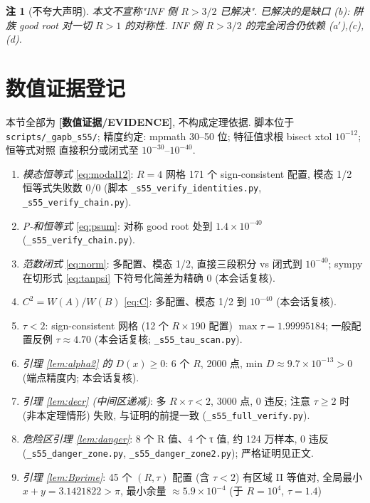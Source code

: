 \documentclass[UTF8]{ctexart}
\newtheorem{remark}[theorem]{注}
\newcommand{\EVID}{\textbf{[数值证据/EVIDENCE]}}
\begin{document}
\begin{remark}[不夸大声明]
	本文\emph{不}宣称"INF 侧 $R>3/2$ 已解决". 已解决的是缺口 (b):
	阱族 good root 对一切 $R>1$ 的对称性. INF 侧 $R>3/2$ 的完全闭合仍依赖
	(a$'$),(c),(d).
\end{remark}

\section{数值证据登记}\label{sec:numerics}

本节全部为 \EVID, 不构成定理依据. 脚本位于 \texttt{scripts/\_gapb\_s55/};
精度约定: mpmath 30--50 位; 特征值求根 bisect xtol $10^{-12}$; 恒等式对照
直接积分或闭式至 $10^{-30}$--$10^{-40}$.

\begin{enumerate}
	\item \emph{模态恒等式} \eqref{eq:modal12}: $R=4$ 网格 171 个 sign-consistent
		配置, 模态 1/2 恒等式失败数 0/0 (脚本 \texttt{\_s55\_verify\_identities.py},
		\texttt{\_s55\_verify\_chain.py}).
	\item \emph{P-和恒等式} \eqref{eq:psum}: 对称 good root 处到 $1.4\times10^{-40}$
		(\texttt{\_s55\_verify\_chain.py}).
	\item \emph{范数闭式} \eqref{eq:norm}: 多配置、模态 1/2, 直接三段积分 vs
		闭式到 $10^{-40}$; sympy 在切形式 \eqref{eq:tanpsi} 下符号化简差为精确 0
		(本会话复核).
	\item \emph{$C^2=W(A)/W(B)$} \eqref{eq:C}: 多配置、模态 1/2 到 $10^{-40}$
		(本会话复核).
	\item \emph{$\tau<2$}: sign-consistent 网格 (12 个 $R\times190$ 配置)
		$\max\tau=1.99995184$; 一般配置反例 $\tau\approx4.70$ (本会话复核;
		\texttt{\_s55\_tau\_scan.py}).
	\item \emph{引理 \ref{lem:alpha2} 的 $D(x)\ge0$}: 6 个 $R$, 2000 点,
		min $D\approx9.7\times10^{-13}>0$ (端点精度内; 本会话复核).
	\item \emph{引理 \ref{lem:decr} (中间区递减)}: 多 $R\times\tau<2$, 3000 点,
		0 违反; 注意 $\tau\ge2$ 时 (非本定理情形) 失败, 与证明的前提一致
		(\texttt{\_s55\_full\_verify.py}).
	\item \emph{危险区引理 \ref{lem:danger}}: 8 个 R 值、4 个 τ 值, 约
		124 万样本, 0 违反 (\texttt{\_s55\_danger\_zone.py},
		\texttt{\_s55\_danger\_zone2.py}); 严格证明见正文.
	\item \emph{引理 \ref{lem:Bprime}}: 45 个 $(R,\tau)$ 配置 (含 $\tau<2$)
		有区域 II 等值对, 全局最小 $x+y=3.1421822>\pi$, 最小余量
		$\approx5.9\times10^{-4}$ (于 $R=10^4$, $\tau=1.4$)

\end{enumerate}
\end{document}

